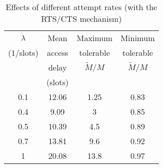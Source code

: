 \documentclass[10pt,twocolumn,oneside,submit]{JCNtran}
\begin{document}
\begin{table}
\caption{Effects of different attempt rates (with the RTS/CTS mechanism)}
\label{tab:tab2}
\begin{center}
{\small \begin{tabular}{|c|c|c|c|}\hline
$\lambda $ & Mean & Maximum & Minimum \\
(1/slots) & access & tolerable & tolerable \\
 & delay & $\tilde M/M$ & $\tilde M/M$ \\
 & (slots) &  &  \\ \hline
0.1 & 12.06 & 1.25 & 0.83 \\
0.4 & 9.09 & 3 & 0.85 \\
0.5 & 10.39 & 4.5 & 0.89 \\
0.7 & 13.81 & 9.6 & 0.92 \\
1 & 20.08 & 13.8 & 0.97 \\ \hline
\end{tabular}}
\end{center}
\end{table}
\end{document}
